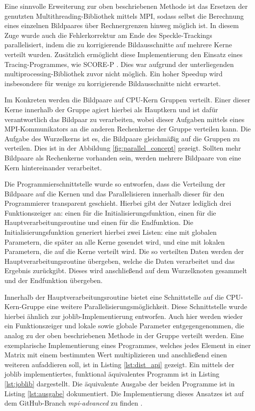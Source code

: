 Eine sinnvolle Erweiterung zur oben beschriebenen Methode ist das Ersetzen der genutzten Mul\-ti\-threa\-ding-Bibliothek mittels MPI, sodass selbst die Berechnung eines einzelnen Bildpaares über Rechnergrenzen hinweg möglich ist. In diesem Zuge wurde auch die Fehlerkorrektur am Ende des Speckle-Trackings parallelisiert, indem die zu korrigierende Bildausschnitte auf mehrere Kerne verteilt wurden. Zusätzlich ermöglicht diese Implementierung den Einsatz eines Tracing-Programmes, wie SCORE-P \cite{KRM+12}. Dies war aufgrund der unterliegenden multiprocessing-Bibliothek zuvor nicht möglich. Ein hoher Speedup wird insbesondere für wenige zu korrigierende Bildausschnitte nicht erwartet. 

Im Konkreten werden die Bildpaare auf \gls{CPU}-Kern Gruppen verteilt. Einer dieser Kerne innerhalb der Gruppe agiert hierbei als Hauptkern und ist dafür verantwortlich das Bildpaar zu verarbeiten, wobei dieser Aufgaben mittels eines \gls{MPI}-Kommunikators an die anderen Rechenkerne der Gruppe verteilen kann. Die Aufgabe des Wurzelkerns ist es, die Bildpaare gleichmäßig auf die Gruppen zu verteilen. Dies ist in der Abbildung \ref{fig:parallel_concept} gezeigt. Sollten mehr Bildpaare als Rechenkerne vorhanden sein, werden mehrere Bildpaare von eine Kern hintereinander verarbeitet. 

Die Programmierschnittstelle wurde so entworfen, dass die Verteilung der Bildpaare auf die Kernen und das Parallelisieren innerhalb dieser für den Programmierer transparent geschieht. Hierbei gibt der Nutzer lediglich drei Funktionszeiger an: einen für die Initialisierungsfunktion, einen für die Hauptverarbeitungsroutine und einen für die Endfunktion. Die Initialisierungsfunktion generiert hierbei zwei Listen: eine mit globalen Parametern, die später an alle Kerne gesendet wird, und eine mit lokalen Parametern, die auf die Kerne verteilt wird. Die so verteilten Daten werden der Hauptverarbeitungsroutine übergeben, welche die Daten verarbeitet und das Ergebnis zurückgibt. Dieses wird anschließend auf dem Wurzelknoten gesammelt und der Endfunktion übergeben. 

Innerhalb der Hauptverarbeitungsroutine bietet eine Schnittstelle auf die \gls{CPU}-Kern-Gruppe eine weitere Parallelisierungsmöglichkeit. Diese Schnittstelle wurde hierbei ähnlich zur joblib-Implementierung entworfen. Auch hier werden wieder ein Funktionszeiger und lokale sowie globale Parameter entgegengenommen, die analog zu der oben beschriebenen Methode in der Gruppe verteilt werden. Eine exemplarische Implementierung eines Programmes, welches jedes Element in einer Matrix mit einem bestimmten Wert multiplizieren und anschließend einen weiteren aufaddieren soll, ist in Listing \ref{lst:dist_api} gezeigt. Ein mittels der joblib implementiertes, funktional äquivalentes Programm ist in Listing \ref{lst:joblib} dargestellt. Die äquivalente Ausgabe der beiden Programme ist in Listing \ref{lst:ausgabe} dokumentiert. Die Implementierung dieses Ansatzes ist auf dem GitHub-Branch \textit{mpi-advanced} zu finden \cite{Coj17}.

